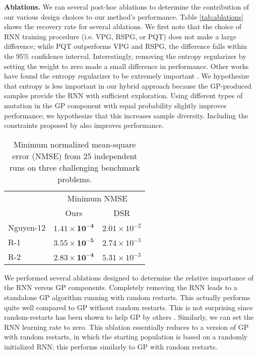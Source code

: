 \documentclass{article}
\begin{document}
\textbf{Ablations.}
We ran several post-hoc ablations to determine the contribution of our various design choices to our method's performance.
Table \ref{tab:ablations} shows the recovery rate for several ablations.
We first note that the choice of RNN training procedure (i.e. VPG, RSPG, or PQT) does not make a large difference; while PQT outperforms VPG and RSPG, the difference falls within the 95\% confidence interval.
Interestingly, removing the entropy regularizer by setting the weight to zero made a small difference in performance.
Other works have found the entropy regularizer to be extremely important \citep{abolafia2018neural, petersen2019deep, larma2021improving}.
We hypothesize that entropy is less important in our hybrid approach because the GP-produced samples provide the RNN with sufficient exploration.
Using different types of mutation in the GP component with equal probability slightly improves performance; we hypothesize that this increases sample diversity.
Including the constraints proposed by \citet{petersen2019deep} also improves performance.

\begin{table}[t]
  \centering
  \caption{Minimum normalized mean-square error (NMSE) from 25 independent runs on three challenging benchmark problems.}
    \begin{tabular}{lcc}
    & \multicolumn{2}{c}{Minimum NMSE} \\
    & Ours & DSR \\
    \cmidrule{2-3}
    Nguyen-12 & $\bm{1.41 \times 10^{-4}}$ & $2.01 \times 10^{-2}$ \\
    R-1 & $\bm{3.55 \times 10^{-5}}$ & $2.74 \times 10^{-3}$ \\
    R-2 & $\bm{2.83 \times 10^{-4}}$ & $5.31 \times 10^{-3}$ \\
\end{tabular}
  \label{tab:hard-cases}
\end{table}

We performed several ablations designed to determine the relative importance of the RNN versus GP components.
Completely removing the RNN leads to a standalone GP algorithm running with random restarts.
This actually performs quite well compared to GP without random restarts. This is not surprising since random-restarts has been shown to help GP by others \citep{houck1996restart, ghannadian1996restart, fukunaga2010restart}.
Similarly, we can set the RNN learning rate to zero.
This ablation essentially reduces to a version of GP with random restarts, in which the starting population is based on a randomly initialized RNN; this performs similarly to GP with random restarts.
\end{document}
